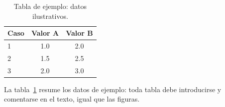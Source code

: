 \begin{table}[htbp]
	\centering
	\caption[Tabla de ejemplo]{Tabla de ejemplo: datos ilustrativos.}
	\label{tab:ejemplo}
	\begin{tabular}{lcc}
	\hline
	Caso & Valor A & Valor B \\
	\hline
	1 & 1.0 & 2.0 \\
	2 & 1.5 & 2.5 \\
	3 & 2.0 & 3.0 \\
	\hline
	\end{tabular}
\end{table}

La tabla~\ref{tab:ejemplo} resume los datos de ejemplo: toda tabla debe
introducirse y comentarse en el texto, igual que las figuras.
